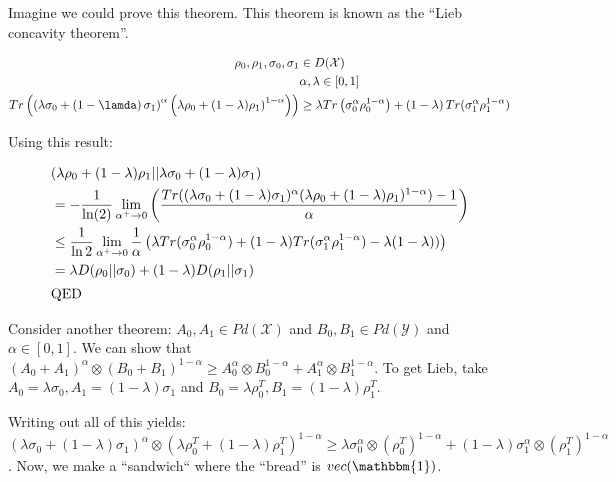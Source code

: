 \documentclass{article}
\begin{document}
        Imagine we could prove this theorem. This theorem is known as
        the ``Lieb concavity theorem''.

        \begin{align}
            \rho_0,\rho_1,\sigma_0,\sigma_1 &\in D(\mathcal{X}) \\
                                            &\alpha, \lambda \in [0,1] \\
            Tr \left( \left( \lambda\sigma_0 + \left( 1-\lamda
                \right)\sigma_1 \right)^\alpha \left( \lambda \rho_0
    +\left(1-\lambda)\rho_1 \right)^{1-\alpha} \right) \right)
    &\ge \lambda Tr \left( \sigma_0^\alpha \rho_0^{1-\alpha} \right) +
    \left( 1-\lambda \right)Tr(\sigma_1^\alpha \rho_1^{1-\alpha})
        \end{align}

        Using this result:

        \begin{align*}
            &(\lambda \rho_0 + (1-\lambda) \rho_1 || \lambda \sigma_0 +
            (1-\lambda)\sigma_1) \\
            & = -\frac{1}{\ln(2)} \lim\limits_{\alpha^+ \rightarrow 0}
            \left( \frac{Tr((\lambda\sigma_0 +
                        (1-\lambda)\sigma_{1})^\alpha ( \lambda\rho_0 +
        (1-\lambda)\rho_1)^{1-\alpha})-1}{\alpha} \right) \\
    & \le \frac{1}{\ln{2}} \lim\limits_{\alpha^+ \rightarrow 0}
        \frac{1}{\alpha} \left( \lambda Tr(\sigma_0^\alpha
            \rho_0^{1-\alpha}) + (1-\lambda)Tr(\sigma_1^\alpha \rho_1
^{1-\alpha}) - \lambda(1-\lambda)) \right) \\
& = \lambda D(\rho_0 || \sigma_0) + ( 1-\lambda) D (\rho_1 ||
\sigma_1)\\
\intertext{QED}
        \end{align*}
        
        Consider another theorem: $ A_0, A_1 \in Pd(\mathcal{X}) $ and $
        B_0, B_1 \in Pd(\mathcal{Y})$  and $ \alpha \in [0,1] $. We can
        show that $ (A_0 + A_1)^\alpha \otimes (B_0 + B_1)^{1-\alpha}
        \ge A_0^\alpha \otimes B_0^{1-\alpha} + A_1^\alpha \otimes
        B_1^{1-\alpha} $. To get Lieb, take $ A_0 = \lambda \sigma_0,
        A_1 = (1-\lambda)\sigma_1 $ and $B_0 = \lambda \rho_0^T, B_1 =
        (1-\lambda)\rho_1^T  $.

        Writing out all of this yields: $ (\lambda\sigma_0 +
            (1-\lambda)\sigma_1)^\alpha \otimes (\lambda \rho_0^T +
        (1-\lambda)\rho_1^T)^{1-\alpha} \ge \lambda \sigma_0^\alpha
        \otimes (\rho_0^T)^{1-\alpha} + (1-\lambda)\sigma_1^\alpha
        \otimes (\rho_1^T)^{1-\alpha} $. Now, we make a ``sandwich``
        where the ``bread'' is $ vec(\mathbbm{1}) $.
\end{document}
